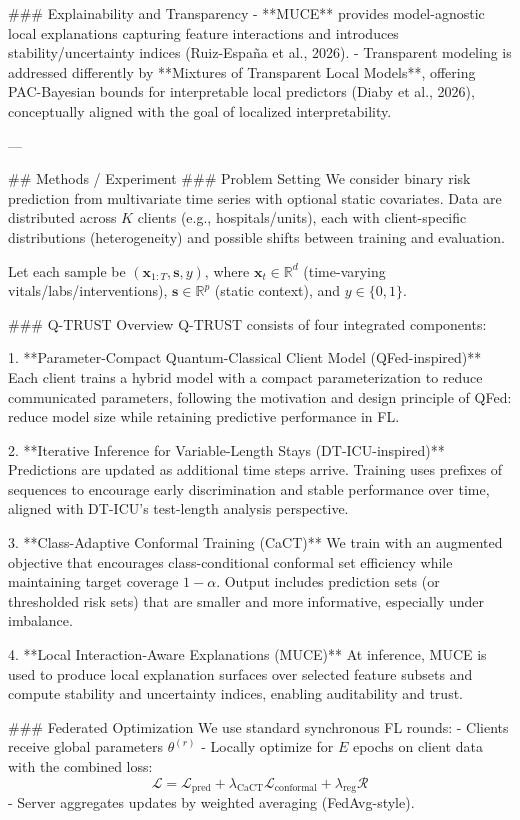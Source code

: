 ### Explainability and Transparency
- **MUCE** provides model-agnostic local explanations capturing feature interactions and introduces stability/uncertainty indices (Ruiz-España et al., 2026).
- Transparent modeling is addressed differently by **Mixtures of Transparent Local Models**, offering PAC-Bayesian bounds for interpretable local predictors (Diaby et al., 2026), conceptually aligned with the goal of localized interpretability.

---

## Methods / Experiment
### Problem Setting
We consider binary risk prediction from multivariate time series with optional static covariates. Data are distributed across \(K\) clients (e.g., hospitals/units), each with client-specific distributions (heterogeneity) and possible shifts between training and evaluation.

Let each sample be \((\mathbf{x}_{1:T}, \mathbf{s}, y)\), where \(\mathbf{x}_{t}\in\mathbb{R}^d\) (time-varying vitals/labs/interventions), \(\mathbf{s}\in\mathbb{R}^p\) (static context), and \(y\in\{0,1\}\).

### Q-TRUST Overview
Q-TRUST consists of four integrated components:

1. **Parameter-Compact Quantum-Classical Client Model (QFed-inspired)**  
   Each client trains a hybrid model with a compact parameterization to reduce communicated parameters, following the motivation and design principle of QFed: reduce model size while retaining predictive performance in FL.

2. **Iterative Inference for Variable-Length Stays (DT-ICU-inspired)**  
   Predictions are updated as additional time steps arrive. Training uses prefixes of sequences to encourage early discrimination and stable performance over time, aligned with DT-ICU’s test-length analysis perspective.

3. **Class-Adaptive Conformal Training (CaCT)**  
   We train with an augmented objective that encourages class-conditional conformal set efficiency while maintaining target coverage \(1-\alpha\). Output includes prediction sets (or thresholded risk sets) that are smaller and more informative, especially under imbalance.

4. **Local Interaction-Aware Explanations (MUCE)**  
   At inference, MUCE is used to produce local explanation surfaces over selected feature subsets and compute stability and uncertainty indices, enabling auditability and trust.

### Federated Optimization
We use standard synchronous FL rounds:
- Clients receive global parameters \(\theta^{(r)}\)
- Locally optimize for \(E\) epochs on client data with the combined loss:
\[
\mathcal{L} = \mathcal{L}_{\text{pred}} + \lambda_{\text{CaCT}}\mathcal{L}_{\text{conformal}} + \lambda_{\text{reg}}\mathcal{R}
\]
- Server aggregates updates by weighted averaging (FedAvg-style).

